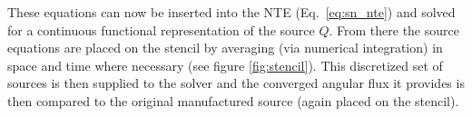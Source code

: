 These equations can now be inserted into the NTE (Eq.~\eqref{eq:sn_nte}) and solved for a continuous functional representation of the source $Q$.
From there the source equations are placed on the stencil by averaging (via numerical integration) in space and time where necessary (see figure \ref{fig:stencil}).
This discretized set of sources is then supplied to the solver and the converged angular flux it provides is then compared to the original manufactured source (again placed on the stencil).


